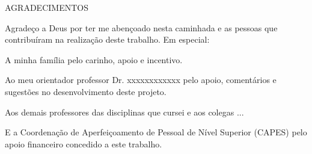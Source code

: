 \clearpage
\thispagestyle{empty}

\begin{center}	
	{\large AGRADECIMENTOS}
\end{center}
\normalsize
\noindent


Agradeço a Deus por ter me abençoado nesta caminhada e as pessoas que contribuíram na realização deste trabalho. Em especial:

A minha família pelo carinho, apoio e incentivo.

Ao meu orientador professor Dr. xxxxxxxxxxxx pelo apoio, comentários e sugestões no desenvolvimento deste projeto.

Aos demais professores das disciplinas que cursei e aos colegas ...

E a Coordenação de Aperfeiçoamento de Pessoal de Nível Superior (CAPES) pelo apoio financeiro concedido a este trabalho.
